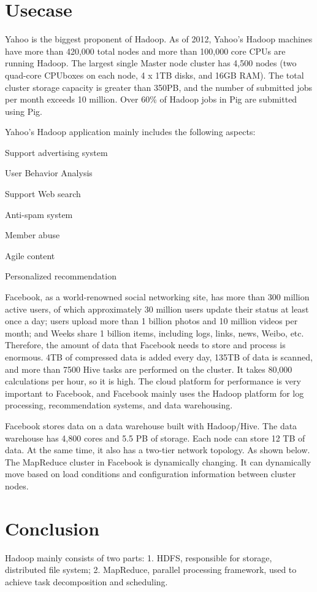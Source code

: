 \section{Usecase}
Yahoo is the biggest proponent of Hadoop. As of 2012, Yahoo's Hadoop machines have more than 420,000 total nodes and more than 100,000 core CPUs are running Hadoop. The largest single Master node cluster has 4,500 nodes (two quad-core CPUboxes on each node, 4 x 1TB disks, and 16GB RAM). The total cluster storage capacity is greater than 350PB, and the number of submitted jobs per month exceeds 10 million. Over 60\% of Hadoop jobs in Pig are submitted using Pig.

Yahoo's Hadoop application mainly includes the following aspects:

Support advertising system

User Behavior Analysis 

Support Web search

Anti-spam system

Member abuse

Agile content

Personalized recommendation


Facebook, as a world-renowned social networking site, has more than 300 million active users, of which approximately 30 million users update their status at least once a day; users upload more than 1 billion photos and 10 million videos per month; and Weeks share 1 billion items, including logs, links, news, Weibo, etc. Therefore, the amount of data that Facebook needs to store and process is enormous. 4TB of compressed data is added every day, 135TB of data is scanned, and more than 7500 Hive tasks are performed on the cluster. It takes 80,000 calculations per hour, so it is high. The cloud platform for performance is very important to Facebook, and Facebook mainly uses the Hadoop platform for log processing, recommendation systems, and data warehousing.

Facebook stores data on a data warehouse built with Hadoop/Hive. The data warehouse has 4,800 cores and 5.5 PB of storage. Each node can store 12 TB of data. At the same time, it also has a two-tier network topology. As shown below. The MapReduce cluster in Facebook is dynamically changing. It can dynamically move based on load conditions and configuration information between cluster nodes.


\section{Conclusion}
Hadoop mainly consists of two parts: 1. HDFS, responsible for storage, distributed file system; 2. MapReduce, parallel processing framework, used to achieve task decomposition and scheduling. 

